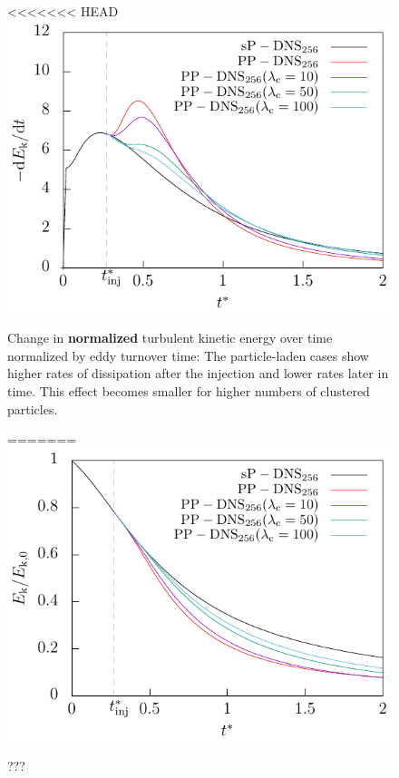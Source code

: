 \documentclass[11pt,a4paper,openany,oneside,parskip=half*]{article}
\begin{document}
\begin{figure}[h]
    \centering
    \begin{minipage}{0.5\textwidth}
        \centering
<<<<<<< HEAD
        \includegraphics[width=\linewidth]{./Abbildungen/256/der(kineticEnergy)_time.pdf}
        \caption{Change in \textbf{normalized} turbulent kinetic energy over time normalized by eddy turnover time: The particle-laden cases  show higher rates of dissipation after the injection and lower rates later in time. This effect becomes smaller for higher numbers of clustered particles.}
        \label{der(kineticEnergy)_time_128}
=======
 	   \includegraphics[width=\linewidth]{./Abbildungen/256/kineticEnergy_time.pdf}
	   \caption{???}

\end{minipage}
\end{figure}
\end{document}
